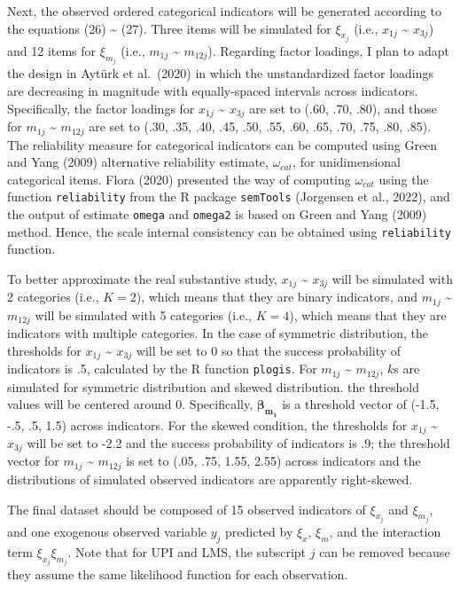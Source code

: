 \documentclass[
  11pt,
  man]{apa6}
\begin{document}
Next, the observed ordered categorical indicators will be generated according to the equations (26) \textasciitilde{} (27). Three items will be simulated for \(\xi_{x_{j}}\) (i.e., \(x_{1j}\) \textasciitilde{} \(x_{3j}\)) and 12 items for \(\xi_{m_{j}}\) (i.e., \(m_{1j}\) \textasciitilde{} \(m_{12j}\)). Regarding factor loadings, I plan to adapt the design in Aytürk et al.~(2020) in which the unstandardized factor loadings are decreasing in magnitude with equally-spaced intervals across indicators. Specifically, the factor loadings for \(x_{1j}\) \textasciitilde{} \(x_{3j}\) are set to (.60, .70, .80), and those for \(m_{1j}\) \textasciitilde{} \(m_{12j}\) are set to (.30, .35, .40, .45, .50, .55, .60, .65, .70, .75, .80, .85). The reliability measure for categorical indicators can be computed using Green and Yang (2009) alternative reliability estimate, \(\omega_{cat}\), for unidimensional categorical items. Flora (2020) presented the way of computing \(\omega_{cat}\) using the function \texttt{reliability} from the R package \texttt{semTools} (Jorgensen et al., 2022), and the output of estimate \texttt{omega} and \texttt{omega2} is based on Green and Yang (2009) method. Hence, the scale internal consistency can be obtained using \texttt{reliability} function.

To better approximate the real substantive study, \(x_{1j}\) \textasciitilde{} \(x_{3j}\) will be simulated with 2 categories (i.e., \(K = 2\)), which means that they are binary indicators, and \(m_{1j}\) \textasciitilde{} \(m_{12j}\) will be simulated with 5 categories (i.e., \(K = 4\)), which means that they are indicators with multiple categories. In the case of symmetric distribution, the thresholds for \(x_{1j}\) \textasciitilde{} \(x_{3j}\) will be set to 0 so that the success probability of indicators is .5, calculated by the R function \texttt{plogis}. For \(m_{1j}\) \textasciitilde{} \(m_{12j}\), \(k\)s are simulated for symmetric distribution and skewed distribution.
the threshold values will be centered around 0. Specifically, \(\mathbf{\beta_{m_{1}}}\) is a threshold vector of (-1.5, -.5, .5, 1.5) across indicators. For the skewed condition, the thresholds for \(x_{1j}\) \textasciitilde{} \(x_{3j}\) will be set to -2.2 and the success probability of indicators is .9; the threshold vector for \(m_{1j}\) \textasciitilde{} \(m_{12j}\) is set to (.05, .75, 1.55, 2.55) across indicators and the distributions of simulated observed indicators are apparently right-skewed.

The final dataset should be composed of 15 observed indicators of \(\xi_{x_{j}}\) and \(\xi_{m_{j}}\), and one exogenous observed variable \(y_{j}\) predicted by \(\xi_{x}\), \(\xi_{m}\), and the interaction term \(\xi_{x_{j}}\xi_{m_{j}}\). Note that for UPI and LMS, the subscript \(j\) can be removed because they assume the same likelihood function for each observation.
\end{document}
